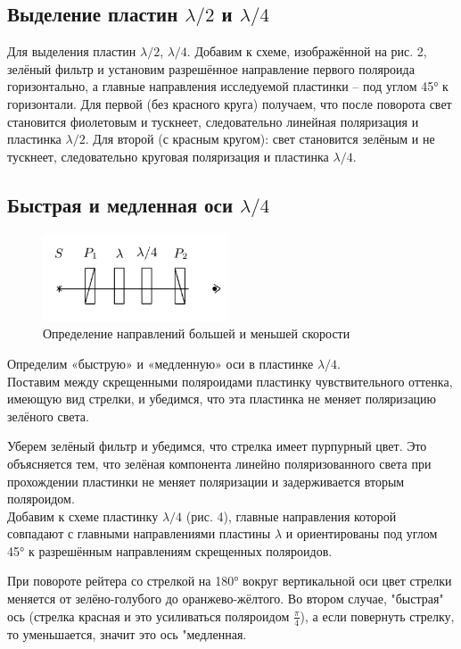 \documentclass[11pt]{article}
\begin{document}
\subsection{Выделение пластин $ \lambda / 2 $ и $ \lambda / 4 $}
Для выделения пластин $ \lambda / 2 $, $ \lambda / 4 $. Добавим к схеме, изображённой на рис. 2, зелёный фильтр и установим разрешённое направление первого поляроида горизонтально, а главные направления исследуемой пластинки -- под углом 45° к горизонтали. Для первой (без красного круга) получаем, что после поворота свет становится фиолетовым и тускнеет, следовательно линейная поляризация и пластинка $ \lambda / 2 $. Для второй (с красным кругом): свет становится зелёным и не тускнеет, следовательно круговая поляризация и пластинка $ \lambda / 4 $.

\subsection{Быстрая и медленная оси $ \lambda / 4 $}
\begin{figure}
    \includegraphics[width=5.5cm]{Screenshot_4.png}
    \caption{Определение направлений большей и меньшей скорости}
    \label{pic:4}
\end{figure}
Определим «быструю» и «медленную» оси в пластинке $ \lambda / 4 $.
\\
Поставим между скрещенными поляроидами пластинку чувствительного оттенка, имеющую вид стрелки, и убедимся, что эта пластинка не меняет поляризацию зелёного света. 

Уберем зелёный фильтр и убедимся, что стрелка имеет пурпурный цвет. Это объясняется тем, что зелёная компонента линейно поляризованного света при прохождении пластинки не меняет поляризации и задерживается вторым поляроидом.
\\
Добавим к схеме пластинку $ \lambda / 4 $ (рис. 4), главные направления которой совпадают с главными направлениями пластины $ \lambda $ и ориентированы под углом 45° к разрешённым направлениям скрещенных поляроидов.

 При повороте рейтера со стрелкой на 180° вокруг вертикальной оси цвет стрелки меняется от зелёно-голубого до оранжево-жёлтого. Во втором случае, "быстрая" ось (стрелка красная и это усиливаться поляроидом $\frac{\pi}{4}$), а если повернуть стрелку, то уменьшается, значит это ось "медленная.
\end{document}

